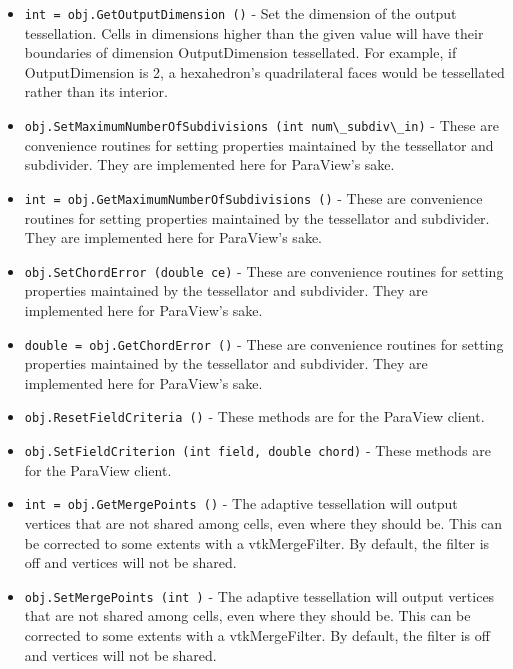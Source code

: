 \begin{itemize}
\item  \verb|int = obj.GetOutputDimension ()| -  Set the dimension of the output tessellation.
 Cells in dimensions higher than the given value will have
 their boundaries of dimension  OutputDimension tessellated.
 For example, if  OutputDimension is 2, a hexahedron's
 quadrilateral faces would be tessellated rather than its
 interior.

\item  \verb|obj.SetMaximumNumberOfSubdivisions (int num\_subdiv\_in)| -  These are convenience routines for setting properties maintained by the
 tessellator and subdivider. They are implemented here for ParaView's
 sake.

\item  \verb|int = obj.GetMaximumNumberOfSubdivisions ()| -  These are convenience routines for setting properties maintained by the
 tessellator and subdivider. They are implemented here for ParaView's
 sake.

\item  \verb|obj.SetChordError (double ce)| -  These are convenience routines for setting properties maintained by the
 tessellator and subdivider. They are implemented here for ParaView's
 sake.

\item  \verb|double = obj.GetChordError ()| -  These are convenience routines for setting properties maintained by the
 tessellator and subdivider. They are implemented here for ParaView's
 sake.

\item  \verb|obj.ResetFieldCriteria ()| -  These methods are for the ParaView client.

\item  \verb|obj.SetFieldCriterion (int field, double chord)| -  These methods are for the ParaView client.

\item  \verb|int = obj.GetMergePoints ()| -  The adaptive tessellation will output vertices that are not shared
 among cells, even where they should be. This can be corrected to
 some extents with a vtkMergeFilter.
 By default, the filter is off and vertices will not be shared.

\item  \verb|obj.SetMergePoints (int )| -  The adaptive tessellation will output vertices that are not shared
 among cells, even where they should be. This can be corrected to
 some extents with a vtkMergeFilter.
 By default, the filter is off and vertices will not be shared.


\end{itemize}
